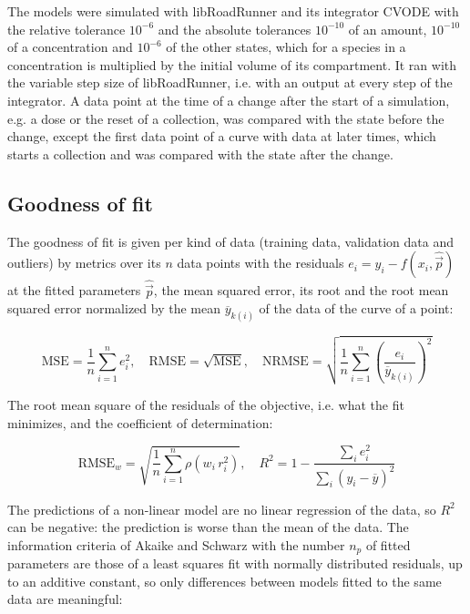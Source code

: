 \documentclass{article}
\begin{document}
The models were simulated with libRoadRunner \cite{Welsh2023} and its integrator CVODE \cite{Hindmarsh2005} with the relative tolerance $10^{-6}$ and the absolute tolerances $10^{-10}$ of an amount, $10^{-10}$ of a concentration and $10^{-6}$ of the other states, which for a species in a concentration is multiplied by the initial volume of its compartment. It ran with the variable step size of libRoadRunner, i.e. with an output at every step of the integrator. A data point at the time of a change after the start of a simulation, e.g. a dose or the reset of a collection, was compared with the state before the change, except the first data point of a curve with data at later times, which starts a collection and was compared with the state after the change.

\subsection{Goodness of fit}

The goodness of fit is given per kind of data (training data, validation data and outliers) by metrics over its $n$ data points with the residuals $e_i = y_i - f(x_i, \hat{\vec{p}})$ at the fitted parameters $\hat{\vec{p}}$, the mean squared error, its root and the root mean squared error normalized by the mean $\overline{y}_{k(i)}$ of the data of the curve of a point:

\begin{equation}
\mathrm{MSE} = \frac{1}{n} \sum_{i=1}^{n} e_i^2, \quad \mathrm{RMSE} = \sqrt{\mathrm{MSE}}, \quad \mathrm{NRMSE} = \sqrt{\frac{1}{n} \sum_{i=1}^{n} \left(\frac{e_i}{\overline{y}_{k(i)}}\right)^2}
\end{equation}

The root mean square of the residuals of the objective, i.e. what the fit minimizes, and the coefficient of determination:

\begin{equation}
\mathrm{RMSE}_w = \sqrt{\frac{1}{n} \sum_{i=1}^{n} \rho\left(w_i\, r_i^2\right)}, \quad R^2 = 1 - \frac{\sum_{i} e_i^2}{\sum_{i} \left(y_i - \overline{y}\right)^2}
\end{equation}

The predictions of a non-linear model are no linear regression of the data, so $R^2$ can be negative: the prediction is worse than the mean of the data. The information criteria of Akaike \cite{Akaike1974} and Schwarz \cite{Schwarz1978} with the number $n_p$ of fitted parameters are those of a least squares fit with normally distributed residuals, up to an additive constant, so only differences between models fitted to the same data are meaningful:
\end{document}
